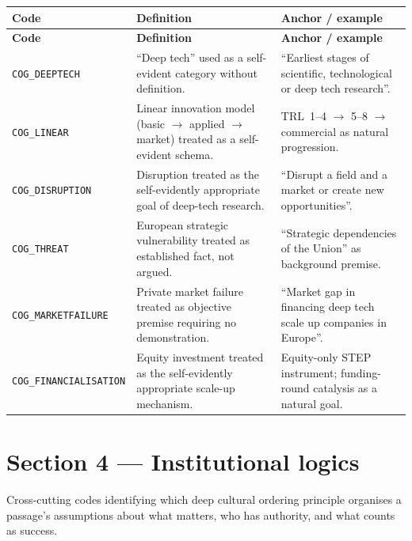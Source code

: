 \begin{longtable}{@{} l p{4.3cm} p{6.3cm} @{}}
\toprule
\textbf{Code} & \textbf{Definition} & \textbf{Anchor / example} \\
\midrule
\endfirsthead
\toprule
\textbf{Code} & \textbf{Definition} & \textbf{Anchor / example} \\
\midrule
\endhead
\bottomrule
\endfoot
\texttt{COG\_DEEPTECH} & \enquote{Deep tech} used as a self-evident category without definition. & \enquote{Earliest stages of scientific, technological or deep tech research}. \\
\texttt{COG\_LINEAR} & Linear innovation model (basic $\rightarrow$ applied $\rightarrow$ market) treated as a self-evident schema. & TRL~1--4 $\rightarrow$ 5--8 $\rightarrow$ commercial as natural progression. \\
\texttt{COG\_DISRUPTION} & Disruption treated as the self-evidently appropriate goal of deep-tech research. & \enquote{Disrupt a field and a market or create new opportunities}. \\
\texttt{COG\_THREAT} & European strategic vulnerability treated as established fact, not argued. & \enquote{Strategic dependencies of the Union} as background premise. \\
\texttt{COG\_MARKETFAILURE} & Private market failure treated as objective premise requiring no demonstration. & \enquote{Market gap in financing deep tech scale up companies in Europe}. \\
\texttt{COG\_FINANCIALISATION} & Equity investment treated as the self-evidently appropriate scale-up mechanism. & Equity-only STEP instrument; funding-round catalysis as a natural goal. \\
\end{longtable}

\section*{Section 4 --- Institutional logics}

Cross-cutting codes identifying which deep cultural ordering principle
organises a passage's assumptions about what matters, who has
authority, and what counts as success.


